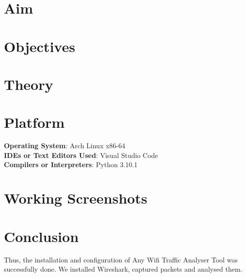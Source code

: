 \documentclass[11pt]{article}
\begin{document}
\tableofcontents
\thispagestyle{empty}
\clearpage

\setcounter{page}{1}

\section{Aim}

\section{Objectives}


\section{Theory}

\section{Platform}
\textbf{Operating System}: Arch Linux x86-64 \\
\textbf{IDEs or Text Editors Used}: Visual Studio Code\\
\textbf{Compilers or Interpreters}: Python 3.10.1\\

\section{Working Screenshots}


\section{Conclusion}
Thus, the installation and configuration of Any Wifi Traffic Analyser Tool was successfully done. We installed Wireshark, captured packets and analysed them. 


\clearpage
\end{document}
